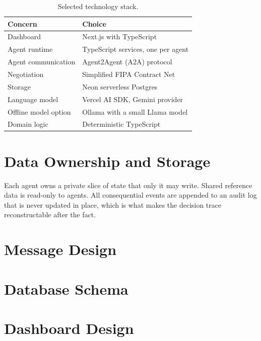 \begin{table}[htbp]
  \centering
  \caption{Selected technology stack.}
  \label{tab:stack}
  \begin{tabular}{@{}ll@{}}
    \toprule
    \textbf{Concern} & \textbf{Choice} \\
    \midrule
    Dashboard            & Next.js with TypeScript \\
    Agent runtime        & TypeScript services, one per agent \\
    Agent communication  & Agent2Agent (A2A) protocol \\
    Negotiation          & Simplified FIPA Contract Net \\
    Storage              & Neon serverless Postgres \\
    Language model       & Vercel AI SDK, Gemini provider \\
    Offline model option & Ollama with a small Llama model \\
    Domain logic         & Deterministic TypeScript \\
    \bottomrule
  \end{tabular}
\end{table}


\section{Data Ownership and Storage}

Each agent owns a private slice of state that only it may write. Shared
reference data is read-only to agents. All consequential events are appended to
an audit log that is never updated in place, which is what makes the decision
trace reconstructable after the fact.


\section{Message Design}


\section{Database Schema}


\section{Dashboard Design}

